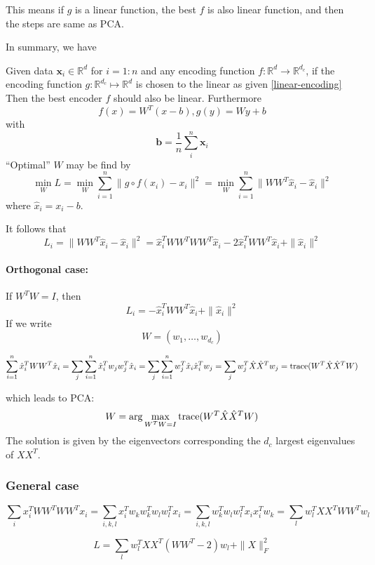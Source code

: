 This means if $g$ is a linear function, the best $f$ is also linear function, and then the steps are same as PCA.
	
In summary, we have
\begin{theorem}
Given data $\mathbf x_i\in \mathbb R^d$ for $i=1:n$ and any encoding
function 
$f:\mathbb R^d\rightarrow \mathbb R^{d_c}$, 
if the encoding function $g:\mathbb R^{d_c}\mapsto \mathbb R^d$ is
chosen to the linear as given 
\eqref{linear-encoding}
Then the best encoder $f$ should also be linear.  Furthermore
\begin{equation}
  \label{encoder-decoder}
f(x)=W^T(x-b), g(y)=Wy+b
\end{equation}
with 
\begin{equation}
\label{b}
\mathbf b = \dfrac 1n \sum_i^n \mathbf x_i
\end{equation}
``Optimal'' $W$ may be find by
\begin{equation}
  \label{eq:1}
  \min_W L
=  \min_W \sum_{i=1}^n\|g\circ f(x_i)-x_i\|^2 
=  \min_W \sum_{i=1}^n\|WW^T\hat x_i-\hat x_i\|^2 
\end{equation}
where $\hat x_i=x_i-b$.
 \end{theorem}

It follows that 
$$
L_i=\|WW^T\hat x_i-\hat x_i\|^2 =
\hat x_i^TWW^TWW^T\hat x_i-2\hat x_i^TWW^T\hat x_i
+\|\hat x_i\|^2 
$$
\paragraph{Orthogonal case:} If $W^TW=I$, then 
$$
L_i=-\hat x_i^TWW^T\hat x_i
+\|\hat x_i\|^2 
$$
If we write
$$
W=(w_1,\ldots,w_{d_c})
$$
\begin{small}
$$
\sum_{i=1}^n\hat x_i^TWW^T\hat x_i 
=\sum_j\sum_{i=1}^n\hat x_i^Tw_jw_j^T\hat x_i 
=\sum_j\sum_{i=1}^nw_j^T\hat x_i \hat x_i^Tw_j 
=\sum_jw_j^T\hat X \hat X^Tw_j 
={\rm trace}(W^T\hat X \hat X^TW)
$$
\end{small}
which leads to PCA:
\begin{equation}
  \label{PCA}
W=\arg\max_{W^TW=I}  {\rm trace}(W^T\hat X \hat X^TW)
\end{equation}
The solution is given by the eigenvectors corresponding the $d_c$
largest eigenvalues of $XX^T$.	

\subsubsection{General case}
\begin{tiny}
$$
\sum_ix_i^TWW^TWW^Tx_i=\sum_{i, k,l}x_i^Tw_k w_k^T w_l w_l^Tx_i
=\sum_{i, k,l}w_k^T w_l w_l^Tx_ix_i^Tw_k 
=\sum_{l}w_l^TXX^TWW^T w_l 
$$
\end{tiny}
$$
L=\sum_{l}w_l^TXX^T(WW^T-2) w_l +\|X\|_F^2
$$
